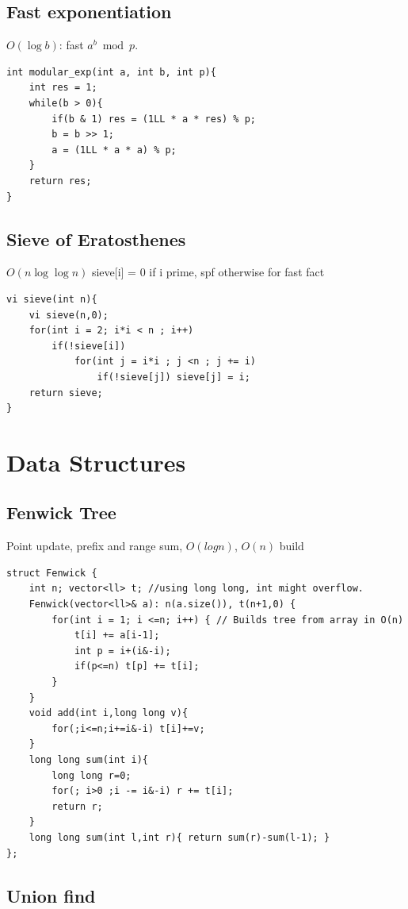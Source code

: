 \documentclass[10pt,a4paper]{article}
\begin{document}
\subsection{Fast exponentiation}

$O(\log b)$: fast $a^b \bmod p$.
\begin{verbatim}
int modular_exp(int a, int b, int p){
    int res = 1;
    while(b > 0){
        if(b & 1) res = (1LL * a * res) % p;
        b = b >> 1;
        a = (1LL * a * a) % p;
    }
    return res;
}
\end{verbatim}

\subsection{Sieve of Eratosthenes}

$O(n \log \log n)$ sieve[i] = 0 if i prime, spf otherwise for fast fact
\begin{verbatim}
vi sieve(int n){
    vi sieve(n,0);
    for(int i = 2; i*i < n ; i++)
        if(!sieve[i])
            for(int j = i*i ; j <n ; j += i)
                if(!sieve[j]) sieve[j] = i;
    return sieve;
}
\end{verbatim}

\section{Data Structures}

\subsection{Fenwick Tree}

Point update, prefix and range sum, $O(log n)$, $O(n)$ build
\begin{verbatim}
struct Fenwick {
    int n; vector<ll> t; //using long long, int might overflow.
    Fenwick(vector<ll>& a): n(a.size()), t(n+1,0) {
        for(int i = 1; i <=n; i++) { // Builds tree from array in O(n)
            t[i] += a[i-1];
            int p = i+(i&-i);
            if(p<=n) t[p] += t[i];
        }
    }
    void add(int i,long long v){
        for(;i<=n;i+=i&-i) t[i]+=v;
    }
    long long sum(int i){
        long long r=0;
        for(; i>0 ;i -= i&-i) r += t[i];
        return r;
    }
    long long sum(int l,int r){ return sum(r)-sum(l-1); }
};
\end{verbatim}

\subsection{Union find}
\end{document}
